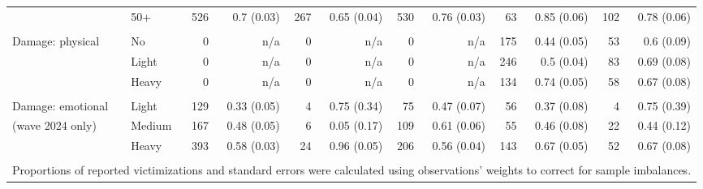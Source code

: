 \begin{tabular}{llrrrrrrrrrr}
	& 50+ & 526 & 0.7 (0.03) & 267 & 0.65 (0.04) & 530 & 0.76 (0.03) & 63 & 0.85 (0.06) & 102 & 0.78 (0.06) \\ 
	\vspace{1pt}\\
	Damage: physical & No & 0 & n/a & 0 & n/a & 0 & n/a & 175 & 0.44 (0.05) & 53 & 0.6 (0.09) \\ 
	& Light & 0 & n/a & 0 & n/a & 0 & n/a & 246 & 0.5 (0.04) & 83 & 0.69 (0.08) \\ 
	& Heavy & 0 & n/a & 0 & n/a & 0 & n/a & 134 & 0.74 (0.05) & 58 & 0.67 (0.08) \\ 
	\vspace{1pt}\\
	Damage: emotional & Light & 129 & 0.33 (0.05) & 4 & 0.75 (0.34) & 75 & 0.47 (0.07) & 56 & 0.37 (0.08) & 4 & 0.75 (0.39) \\ 
	(wave 2024 only) & Medium & 167 & 0.48 (0.05) & 6 & 0.05 (0.17) & 109 & 0.61 (0.06) & 55 & 0.46 (0.08) & 22 & 0.44 (0.12) \\ 
	& Heavy & 393 & 0.58 (0.03) & 24 & 0.96 (0.05) & 206 & 0.56 (0.04) & 143 & 0.67 (0.05) & 52 & 0.67 (0.08) \\ 
	\bottomrule
	\vspace{1pt}\\
	\multicolumn{12}{l}{\small Proportions of reported victimizations and standard errors were calculated using observations' weights to correct for sample imbalances.}
\end{tabular}